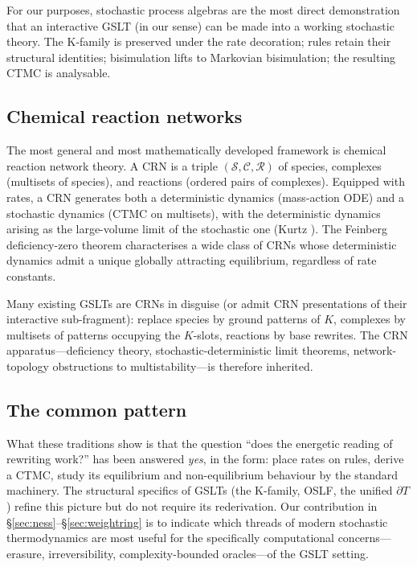 \documentclass[11pt]{article}
\theoremstyle{plain}
\theoremstyle{definition}
\theoremstyle{remark}
\newcommand{\bd}{\partial}
\begin{document}
For our purposes, stochastic process algebras are the most direct demonstration that an interactive GSLT (in our sense) can be made into a working stochastic theory. The K-family is preserved under the rate decoration; rules retain their structural identities; bisimulation lifts to Markovian bisimulation; the resulting CTMC is analysable.

\subsection{Chemical reaction networks}

The most general and most mathematically developed framework is chemical reaction network theory. A CRN is a triple $(\mathcal{S}, \mathcal{C}, \mathcal{R})$ of species, complexes (multisets of species), and reactions (ordered pairs of complexes). Equipped with rates, a CRN generates both a deterministic dynamics (mass-action ODE) and a stochastic dynamics (CTMC on multisets), with the deterministic dynamics arising as the large-volume limit of the stochastic one (Kurtz \cite{Kurtz72}). The Feinberg deficiency-zero theorem \cite{Feinberg19} characterises a wide class of CRNs whose deterministic dynamics admit a unique globally attracting equilibrium, regardless of rate constants.

Many existing GSLTs are CRNs in disguise (or admit CRN presentations of their interactive sub-fragment): replace species by ground patterns of $K$, complexes by multisets of patterns occupying the $K$-slots, reactions by base rewrites. The CRN apparatus---deficiency theory, stochastic-deterministic limit theorems, network-topology obstructions to multistability---is therefore inherited.

\subsection{The common pattern}

What these traditions show is that the question ``does the energetic reading of rewriting work?'' has been answered \emph{yes}, in the form: place rates on rules, derive a CTMC, study its equilibrium and non-equilibrium behaviour by the standard machinery. The structural specifics of GSLTs (the K-family, OSLF, the unified $\bd T$) refine this picture but do not require its rederivation. Our contribution in \S\ref{sec:ness}--\S\ref{sec:weightring} is to indicate which threads of modern stochastic thermodynamics are most useful for the specifically computational concerns---erasure, irreversibility, complexity-bounded oracles---of the GSLT setting.
\end{document}
